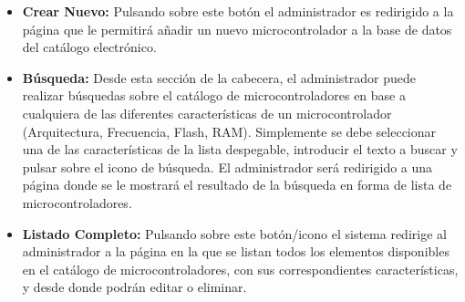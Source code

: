 \begin{itemize}
	\item \textbf{Crear Nuevo:} Pulsando sobre este botón el administrador es redirigido a la página que le permitirá añadir un nuevo microcontrolador a la base de datos del catálogo electrónico.

	\item \textbf{Búsqueda:} Desde esta sección de la cabecera, el administrador puede realizar búsquedas sobre el catálogo de microcontroladores en base a cualquiera de las diferentes características de un microcontrolador (Arquitectura, Frecuencia, Flash, RAM). Simplemente se debe seleccionar una de las características de la lista despegable, introducir el texto a buscar y pulsar sobre el icono de búsqueda.
	El administrador será redirigido a una página donde se le mostrará el resultado de la búsqueda en forma de lista de microcontroladores.
			
	\item \textbf{Listado Completo:} Pulsando sobre este botón/icono el sistema redirige al administrador a la página en la que se listan todos los elementos disponibles en el catálogo de microcontroladores, con sus correspondientes características, y desde donde podrán editar o eliminar.
\end{itemize}